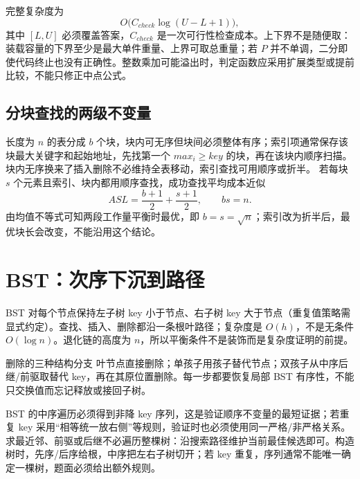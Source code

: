 \documentclass[UTF8,fontset=none,11pt,a4paper]{ctexart}
\begin{document}
完整复杂度为
\[
O\bigl(C_{check}\log(U-L+1)\bigr),
\]
其中 $[L,U]$ 必须覆盖答案，$C_{check}$ 是一次可行性检查成本。上下界不是随便取：装载容量的下界至少是最大单件重量、上界可取总重量；若 $P$ 并不单调，二分即使代码终止也没有正确性。整数乘加可能溢出时，判定函数应采用扩展类型或提前比较，不能只修正中点公式。

\subsection{分块查找的两级不变量}
长度为 $n$ 的表分成 $b$ 个块，块内可无序但块间必须整体有序；索引项通常保存该块最大关键字和起始地址，先找第一个 $max_i\ge key$ 的块，再在该块内顺序扫描。块内无序换来了插入删除不必维持全表移动，索引查找可用顺序或折半。
若每块 $s$ 个元素且索引、块内都用顺序查找，成功查找平均成本近似
\[
ASL=\frac{b+1}{2}+\frac{s+1}{2},\qquad bs=n.
\]
由均值不等式可知两段工作量平衡时最优，即 $b=s=\sqrt n$；索引改为折半后，最优块长会改变，不能沿用这个结论。

\section{BST：次序下沉到路径}
BST 对每个节点保持左子树 key 小于节点、右子树 key 大于节点（重复值策略需显式约定）。查找、插入、删除都沿一条根叶路径；复杂度是 $O(h)$，不是无条件 $O(\log n)$。退化链的高度为 $n$，所以平衡条件不是装饰而是复杂度证明的前提。
\begin{examplebox}{删除的三种结构分支}
叶节点直接删除；单孩子用孩子替代节点；双孩子从中序后继/前驱取替代 key，再在其原位置删除。每一步都要恢复局部 BST 有序性，不能只交换值而忘记释放或接回子树。
\end{examplebox}

BST 的中序遍历必须得到非降 key 序列，这是验证顺序不变量的最短证据；若重复 key 采用“相等统一放右侧”等规则，验证时也必须使用同一严格/非严格关系。求最近邻、前驱或后继不必遍历整棵树：沿搜索路径维护当前最佳候选即可。构造树时，先序/后序给根，中序把左右子树切开；若 key 重复，序列通常不能唯一确定一棵树，题面必须给出额外规则。
\end{document}
